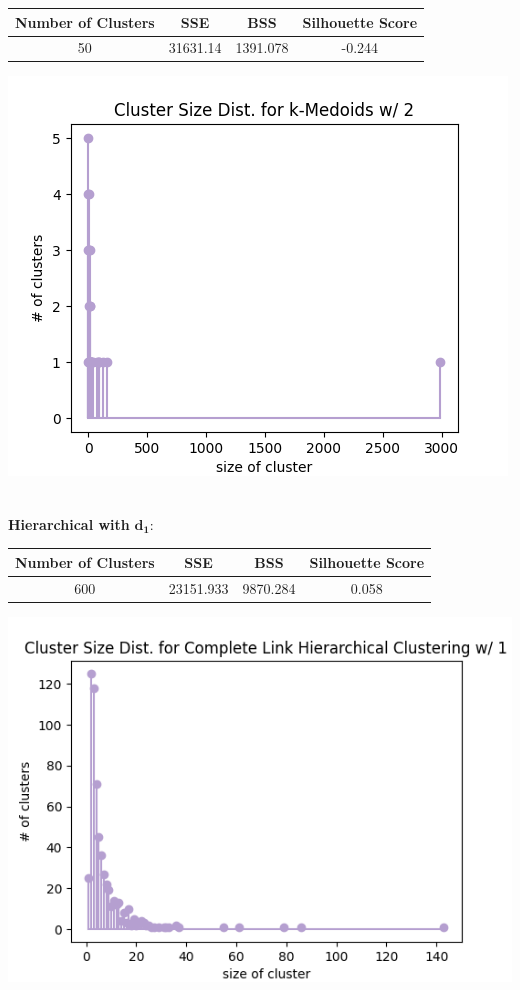 \documentclass[fleqn]{article}
\begin{document}
\begin{minipage}{0.65\textwidth}
	\begin{tabular}{|c|c|c|c|}
    	\hline
    	\textbf{Number of Clusters} & \textbf{SSE} &\textbf{BSS} &\textbf{Silhouette Score}\\
    	\hline
    	50 & 31631.14 & 1391.078 & -0.244\\
    	\hline
	\end{tabular}
\end{minipage}\begin{minipage}{0.35\textwidth}
	\includegraphics[scale=0.35]{images/size_dist_km_d2.png}
\end{minipage}\\
\textbf{Hierarchical with }$\mathbf{d_1}$:\\
\begin{minipage}{0.65\textwidth}
\begin{tabular}{|c|c|c|c|}
	\hline
	\textbf{Number of Clusters} & \textbf{SSE} &\textbf{BSS} &\textbf{Silhouette Score}\\
	\hline
	600 & 23151.933 & 9870.284 & 0.058\\
	\hline
\end{tabular}
\end{minipage}
\begin{minipage}{0.35\textwidth}
\includegraphics[scale=0.35]{images/size_dist_hc_d1.png}\end{minipage}\\
\end{document}
